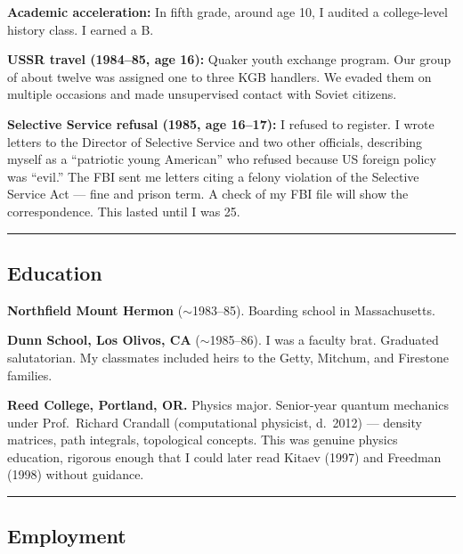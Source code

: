 \textbf{Academic acceleration:} In fifth grade, around age 10, I audited a college-level history class. I earned a B.

\textbf{USSR travel (1984--85, age 16):} Quaker youth exchange program. Our group of about twelve was assigned one to three KGB handlers. We evaded them on multiple occasions and made unsupervised contact with Soviet citizens.

\textbf{Selective Service refusal (1985, age 16--17):} I refused to register. I wrote letters to the Director of Selective Service and two other officials, describing myself as a ``patriotic young American'' who refused because US foreign policy was ``evil.'' The FBI sent me letters citing a felony violation of the Selective Service Act --- fine and prison term. A check of my FBI file will show the correspondence. This lasted until I was 25.

\vspace{1cm}\hrule\vspace{1cm}

\subsection*{Education}
\label{record:tgt-education}

\textbf{Northfield Mount Hermon} ($\sim$1983--85). Boarding school in Massachusetts.

\textbf{Dunn School, Los Olivos, CA} ($\sim$1985--86). I was a faculty brat. Graduated salutatorian. My classmates included heirs to the Getty, Mitchum, and Firestone families.

\textbf{Reed College, Portland, OR.} Physics major. Senior-year quantum mechanics under Prof.\ Richard Crandall (computational physicist, d.\ 2012) --- density matrices, path integrals, topological concepts. This was genuine physics education, rigorous enough that I could later read Kitaev (1997) and Freedman (1998) without guidance.

\vspace{1cm}\hrule\vspace{1cm}

\subsection*{Employment}
\label{record:tgt-employment-history}

